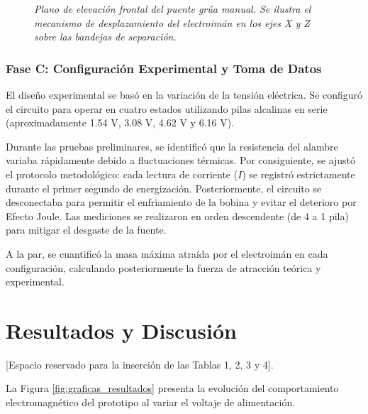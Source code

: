 \begin{figure}[H]
{%
  }
  \caption{\textit{Plano de elevación frontal del puente grúa manual. Se ilustra el mecanismo de desplazamiento del electroimán en los ejes X y Z sobre las bandejas de separación.}}
  \label{fig:esquema_grua}
\end{figure}

\subsubsection{Fase C: Configuración Experimental y Toma de Datos}
El diseño experimental se basó en la variación de la tensión eléctrica. Se configuró el circuito para operar en cuatro estados utilizando pilas alcalinas en serie (aproximadamente 1.54 V, 3.08 V, 4.62 V y 6.16 V).

Durante las pruebas preliminares, se identificó que la resistencia del alambre variaba rápidamente debido a fluctuaciones térmicas. Por consiguiente, se ajustó el protocolo metodológico: cada lectura de corriente ($I$) se registró estrictamente durante el primer segundo de energización. Posteriormente, el circuito se desconectaba para permitir el enfriamiento de la bobina y evitar el deterioro por Efecto Joule. Las mediciones se realizaron en orden descendente (de 4 a 1 pila) para mitigar el desgaste de la fuente.

A la par, se cuantificó la masa máxima atraída por el electroimán en cada configuración, calculando posteriormente la fuerza de atracción teórica y experimental.

\section{Resultados y Discusión}

[Espacio reservado para la inserción de las Tablas 1, 2, 3 y 4].

La Figura \ref{fig:graficas_resultados} presenta la evolución del comportamiento electromagnético del prototipo al variar el voltaje de alimentación.

